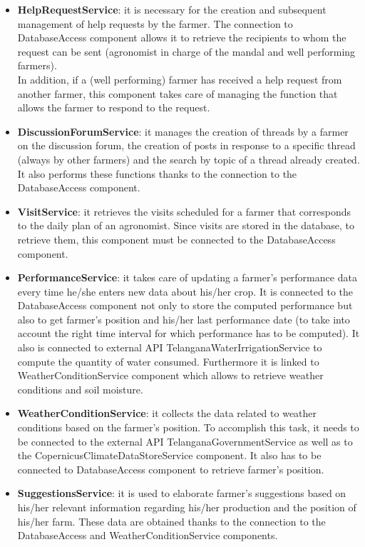 \begin{itemize}
\begin{itemize}
    \item \textbf{HelpRequestService}: it is necessary for the creation and subsequent management of help requests by the farmer. The connection to DatabaseAccess component allows it to retrieve the recipients to whom the request can be sent (agronomist in charge of the mandal and well performing farmers).\\
    In addition, if a (well performing) farmer has received a help request from another farmer, this component takes care of managing the function that allows the farmer to respond to the request.
    \item \textbf{DiscussionForumService}: it manages the creation of threads by a farmer on the discussion forum, the creation of posts in response to a specific thread (always by other farmers) and the search by topic of a thread already created. It also performs these functions thanks to the connection to the DatabaseAccess component.
    \item \textbf{VisitService}: it retrieves the visits scheduled for a farmer that corresponds to the daily plan of an agronomist.
    Since visits are stored in the database, to retrieve them, this component must be connected to the DatabaseAccess component.
    \item \textbf{PerformanceService}: it takes care of updating a farmer's performance data every time he/she enters new data about his/her crop. It is connected to the DatabaseAccess component not only to store the computed performance but also to get farmer's position and his/her last performance date (to take into account the right time interval for which performance has to be computed).
    It also is connected to external API TelanganaWaterIrrigationService to compute the quantity of water consumed. Furthermore it is linked to WeatherConditionService component which allows to retrieve weather conditions and soil moisture.
    \item \textbf{WeatherConditionService}: it collects the data related to weather conditions based on the farmer's position. To accomplish this task, it needs to be connected to the external API TelanganaGovernmentService as well as to the CopernicusClimateDataStoreService component. It also has to be connected to DatabaseAccess component to retrieve farmer's position.
    \item \textbf{SuggestionsService}: it is used to elaborate farmer's suggestions based on his/her relevant information regarding his/her production and the position of his/her farm. These data are obtained thanks to the connection to the DatabaseAccess and WeatherConditionService components.
\end{itemize}


\end{itemize}
